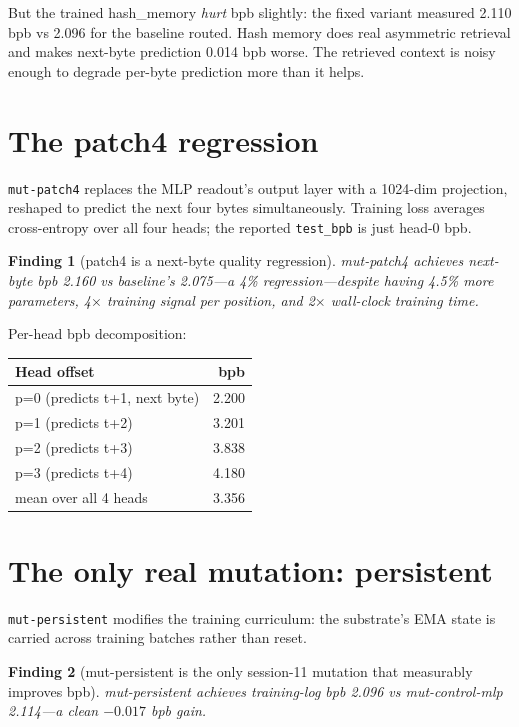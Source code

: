 \documentclass[11pt,openany]{book}
\newtheorem{finding}{Finding}[chapter]
\begin{document}
But the trained hash\_memory \emph{hurt} bpb slightly: the fixed
variant measured 2.110 bpb vs 2.096 for the baseline routed. Hash
memory does real asymmetric retrieval and makes next-byte prediction
0.014 bpb worse. The retrieved context is noisy enough to degrade
per-byte prediction more than it helps.

\section{The patch4 regression}

\texttt{mut-patch4} replaces the MLP readout's output layer with a
1024-dim projection, reshaped to predict the next four bytes
simultaneously. Training loss averages cross-entropy over all four
heads; the reported \texttt{test\_bpb} is just head-0 bpb.

\begin{finding}[patch4 is a next-byte quality regression]
mut-patch4 achieves next-byte bpb 2.160 vs baseline's 2.075---a 4\%
regression---despite having 4.5\% more parameters, 4$\times$ training
signal per position, and 2$\times$ wall-clock training time.
\end{finding}

Per-head bpb decomposition:

\begin{longtable}{lr}
\toprule
Head offset & bpb \\
\midrule
p=0 (predicts t+1, next byte) & 2.200 \\
p=1 (predicts t+2) & 3.201 \\
p=2 (predicts t+3) & 3.838 \\
p=3 (predicts t+4) & 4.180 \\
mean over all 4 heads & 3.356 \\
\bottomrule
\end{longtable}

\section{The only real mutation: persistent}

\texttt{mut-persistent} modifies the training curriculum: the
substrate's EMA state is carried across training batches rather than
reset.

\begin{finding}[mut-persistent is the only session-11 mutation that
measurably improves bpb]
mut-persistent achieves training-log bpb 2.096 vs mut-control-mlp
2.114---a clean $-0.017$ bpb gain.
\end{finding}
\end{document}
